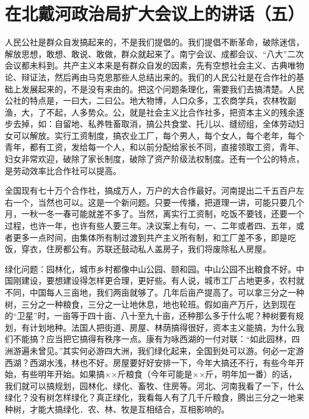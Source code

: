 \section[在北戴河政治局扩大会议上的讲话（五）（一九五八年八月三十日上午）]{在北戴河政治局扩大会议上的讲话（五）}


人民公社是群众自发搞起来的，不是我们提倡的。我们提倡不断革命，破除迷信，解放思想，敢想、敢说、敢做，群众就起来了。南宁会议、成都会议、“八大”二次会议都未料到。共产主义本来是有群众自发的因素，先有空想社会主义、古典唯物论、辩证法，然后再由马克思那些人总结出来的。我们的人民公社是在合作社的基础上发展起来的，不是没有来由的。把这个问题条理化，需要我们去搞清楚。人民公社的特点是，一曰大，二曰公。地大物博，人口众多，工农商学兵，农林牧副渔，大，了不起，人多势众。公，就是社会主义比合作社多，把资本主义的残余逐步去掉，如：自留地、私养牲畜取消，搞公共食堂、托儿以、缝纫组，全体劳动妇女可以解放。实行工资制度，搞农业工厂，每个男人，每个女人，每个老年，每个青年，都有工资，发给每一个人，和以前分配给家长不同，直接领取工资，青年、妇女非常欢迎，破除了家长制度，破除了资产阶级法权制度。还有一个公的特点，是劳动效率比合作社可以提高。

全国现有七十万个合作社，搞成万人，万户的大合作最好。河南提出二千五百户左右一个，当然也可以。这是一个新问题。只要一传播，把道理一讲，可能只要几个月，一秋一冬一春可能就差不多了。当然，离实行工资制，吃饭不要钱，还要一个过程，也许一年，也许有些人要三年。决议案上有句，一、二年或者四、五年，或者更多一点时间，由集体所有制过渡到共产主义所有制，和工厂差不多，即是吃饭，穿衣，住房都公有。苏联还鼓动私人盖房子，我们将废除私人房屋。

绿化问题：园林化，城市乡村都像中山公园、颐和园。中山公园不出粮食不好。中国刚建设，要想建设得怎样更合理，更好些。有人说，城市工厂占地更多，农村就不同，中国每人三亩地，我们两亩就够了。几年后亩产提高了。可以拿三分之一种树，三分之一种粮食，三分之一让地休息，地也轮班。假如亩产万斤，达到现在的“卫星”时，一亩等于四十亩、八十至九十亩，还种那么多于什么呢？种树要有规划，有计划地种。法国人把街道、房屋、林荫搞得很好，资本主义能搞，为什么我们不能搞？应当把它搞得有秩序一点。康有为咏西湖的一付对联：“如此园林，四洲游遍未曾见。”其实何必游四大洲，我们绿化起来，全国到处可以游。何必一定游西湖？西湖水浅，林也不好。房屋要好好安排一下，今年大搞还不行，有些今年开始，有些明年开始。如果搞××斤粮食（今年可能是××斤，明年加一番）的话，我们就可以搞规划，园林化、绿化、畜牧、住房等。河北、河南我看了一下，什么绿化？没有树怎样绿化？真正绿化，我看每人有了几千斤粮食，腾出三分之一地来种树，才能大搞绿化．农、林、牧是互相结合，互相影响的。


